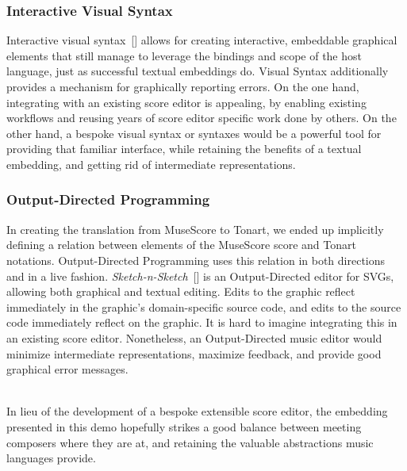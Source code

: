 \documentclass[10pt, sigplan]{acmart}
\newcommand{\Ssubsubsection}[2]{\subsubsection[#1]{#2}}
\newcommand{\AutobibLink}[1]{\color{ACMPurple}{#1}}
\newcommand{\Autobibref}[1]{#1}
\providecommand{\AutobibLink}[1]{#1}
\begin{document}
\Ssubsubsection{Interactive Visual Syntax}{Interactive Visual Syntax}\label{t:x28part_x22Interactivex5fVisualx5fSyntaxx22x29}

Interactive visual syntax\Autobibref{~[\hyperref[t:x28autobib_x22Andersenx2c_Leifx2c_Ballantynex2c_Michaelx2c_and_Felleisenx2c_MatthiasAdding_interactive_visual_syntax_to_textual_codeIn_Procx2e_ACM_on_Programming_Languagesx2c_ppx2e_1x2dx2d282020httpsx3ax2fx2fdoix2eorgx2f10x2e1145x2f3428290x22x29]{\AutobibLink{3}}]} allows for creating interactive,
embeddable graphical elements that still manage to leverage the bindings and
scope of the host language, just as successful textual embeddings do.  Visual
Syntax additionally provides a mechanism for graphically reporting errors.  On
the one hand, integrating with an existing score editor is appealing, by
enabling existing workflows and reusing years of score editor specific work done
by others.  On the other hand, a bespoke visual syntax or syntaxes would be a
powerful tool for providing that familiar interface, while retaining the
benefits of a textual embedding, and getting rid of intermediate
representations.

\Ssubsubsection{Output{-}Directed Programming}{Output{-}Directed Programming}\label{t:x28part_x22Outputx2dDirectedx5fProgrammingx22x29}

In creating the translation from MuseScore to Tonart, we ended up implicitly
defining a relation between elements of the MuseScore score and Tonart
notations.  Output{-}Directed Programming uses this relation in both directions
and in a live fashion.  \emph{Sketch{-}n{-}Sketch}\Autobibref{~[\hyperref[t:x28autobib_x22Hempelx2c_Brianx2c_Lubinx2c_Justinx2c_and_Chughx2c_RaviSketchx2dnx2dSketchx3a_Outputx2dDirected_Programming_for_SVGIn_Procx2e_32nd_Annual_ACM_Symposium_on_User_Interface_Software_and_Technologyx2c_ppx2e_281x2dx2d2922019httpsx3ax2fx2fdoix2eorgx2f10x2e1145x2f3332165x2e3347925x22x29]{\AutobibLink{1}}]} is an
Output{-}Directed editor for SVGs, allowing both graphical and textual editing.
Edits to the graphic reflect immediately in the graphic{'}s domain{-}specific source
code, and edits to the source code immediately reflect on the graphic.  It is
hard to imagine integrating this in an existing score editor.  Nonetheless, an
Output{-}Directed music editor would minimize intermediate representations,
maximize feedback, and provide good graphical error messages.

\hspace*{\fill}\\
In lieu of the development of a bespoke extensible score editor, the embedding
presented in this demo hopefully strikes a good balance between meeting
composers where they are at, and retaining the valuable abstractions music
languages provide.\label{t:x28part_x28gentag_4x29x29}
\end{document}
